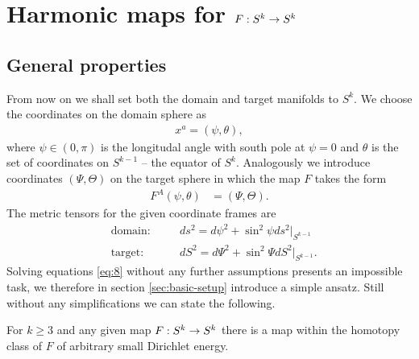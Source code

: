 \section{Harmonic maps for $F:S^k\rightarrow S^k$}
\label{sec:harmonic-maps-skra}

\subsection{General properties}
\label{sec:general-properties}

From now on we shall set both the domain and target manifolds to
$S^k$. We choose the coordinates on the domain sphere as
\begin{align}
  \label{eq:9}
  x^a=(\psi,\theta),
\end{align}
where $\psi\in(0,\pi)$ is the longitudal angle with
south pole at $\psi=0$ and $\theta$ is the set of coordinates on
$S^{k-1}$ -- the equator of $S^k$. Analogously we introduce
coordinates $(\Psi,\Theta)$ on the target sphere in which the map $F$
takes the form
\begin{align}
  \label{eq:10}
  F^A(\psi,\theta)&=(\Psi,\Theta).
\end{align}
The metric tensors for the given coordinate frames are
\begin{align}
  \label{eq:11}
  &\text{domain:}&\quad &ds^2=d\psi^2+\sin^2\psi ds^2\big|_{S^{k-1}}\\
  &\text{target:}&\quad &dS^2=d\Psi^2+\sin^2\Psi dS^2\big|_{S^{k-1}}.
\end{align}
Solving equations \eqref{eq:8} without any further assumptions
presents an impossible task, we therefore in section
\ref{sec:basic-setup} introduce a simple ansatz. Still without any
simplifications we can state the following.

\begin{theorem}\label{thm:skk-energy-bound}
  For $k\ge3$ and any given map $F:S^k\rightarrow S^k$ there is a map within
  the homotopy class of $F$ of arbitrary small Dirichlet energy.
\end{theorem}

